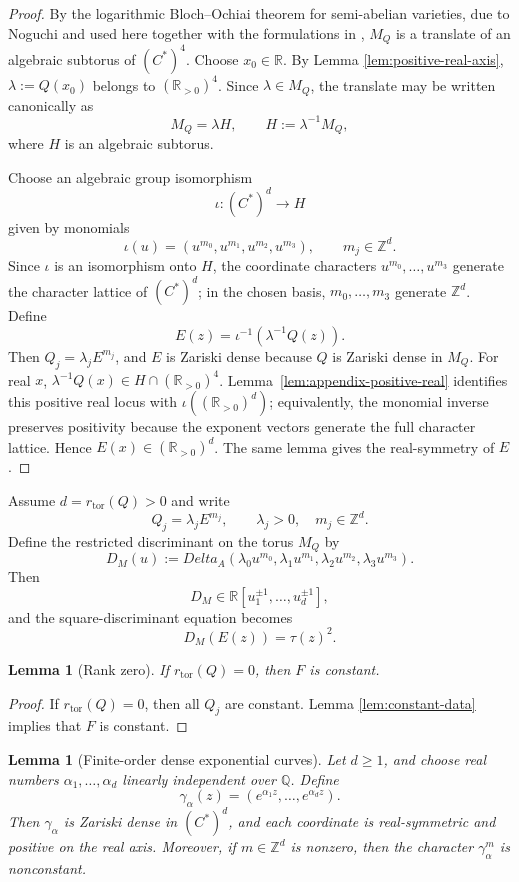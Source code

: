 \documentclass[11pt]{amsart}
\def\CC{C}%
\def\DeltaA{Delta_A}%
\numberwithin{equation}{section}
\newtheorem{lemma}[theorem]{Lemma}
\theoremstyle{definition}
\theoremstyle{remark}
\newcommand{\CC}{\mathbb C}
\newcommand{\RR}{\mathbb R}
\newcommand{\QQ}{\mathbb Q}
\newcommand{\ZZ}{\mathbb Z}
\newcommand{\DeltaA}{\Delta_A}
\newcommand{\rtor}{r_{\mathrm{tor}}}
\begin{document}
\begin{proof}
By the logarithmic Bloch--Ochiai theorem for semi-abelian varieties, due to Noguchi \cite[Main Theorem~(i)]{Noguchi1998HolomorphicCurves} and used here together with the formulations in \cite{NoguchiWinkelmannYamanoi2002SMT,DethloffLu2001LogarithmicJetBundles}, $M_Q$ is a translate of an algebraic subtorus of $(\CC^*)^4$. Choose $x_0\in\RR$. By Lemma \ref{lem:positive-real-axis}, $\lambda:=Q(x_0)$ belongs to $(\RR_{>0})^4$.  Since $\lambda\in M_Q$, the translate may be written canonically as
\[
M_Q=\lambda H,
\qquad
H:=\lambda^{-1}M_Q,
\]
where $H$ is an algebraic subtorus.

Choose an algebraic group isomorphism
\[
\iota:(\CC^*)^d\to H
\]
given by monomials
\[
\iota(u)=(u^{m_0},u^{m_1},u^{m_2},u^{m_3}),\qquad m_j\in\ZZ^d.
\]
Since $\iota$ is an isomorphism onto $H$, the coordinate characters $u^{m_0},\ldots,u^{m_3}$ generate the character lattice of $(\CC^*)^d$; in the chosen basis, $m_0,\ldots,m_3$ generate $\ZZ^d$.
Define
\[
E(z)=\iota^{-1}(\lambda^{-1}Q(z)).
\]
Then $Q_j=\lambda_jE^{m_j}$, and $E$ is Zariski dense because $Q$ is Zariski dense in $M_Q$. For real $x$, $\lambda^{-1}Q(x)\in H\cap(\RR_{>0})^4$.  Lemma~\ref{lem:appendix-positive-real} identifies this positive real locus with $\iota((\RR_{>0})^d)$; equivalently, the monomial inverse preserves positivity because the exponent vectors generate the full character lattice.  Hence $E(x)\in(\RR_{>0})^d$. The same lemma gives the real-symmetry of $E$.
\end{proof}

Assume $d=\rtor(Q)>0$ and write
\[
Q_j=\lambda_jE^{m_j},\qquad \lambda_j>0,\quad m_j\in\ZZ^d.
\]
Define the restricted discriminant on the torus $M_Q$ by
\[
D_M(u):=\DeltaA(\lambda_0u^{m_0},\lambda_1u^{m_1},\lambda_2u^{m_2},\lambda_3u^{m_3}).
\]
Then
\[
D_M\in\RR[u_1^{\pm1},\dots,u_d^{\pm1}],
\]
and the square-discriminant equation becomes
\[
D_M(E(z))=\tau(z)^2.
\]

\begin{lemma}[Rank zero]\label{lem:rank-zero}
If $\rtor(Q)=0$, then $F$ is constant.
\end{lemma}

\begin{proof}
If $\rtor(Q)=0$, then all $Q_j$ are constant. Lemma \ref{lem:constant-data} implies that $F$ is constant.
\end{proof}

\begin{lemma}[Finite-order dense exponential curves]\label{lem:dense-exponential}
Let $d\ge1$, and choose real numbers $\alpha_1,\dots,\alpha_d$ linearly independent over $\QQ$. Define
\[
\gamma_\alpha(z)=(e^{\alpha_1z},\dots,e^{\alpha_dz}).
\]
Then $\gamma_\alpha$ is Zariski dense in $(\CC^*)^d$, and each coordinate is real-symmetric and positive on the real axis. Moreover, if $m\in\ZZ^d$ is nonzero, then the character $\gamma_\alpha^m$ is nonconstant.
\end{lemma}
\end{document}
